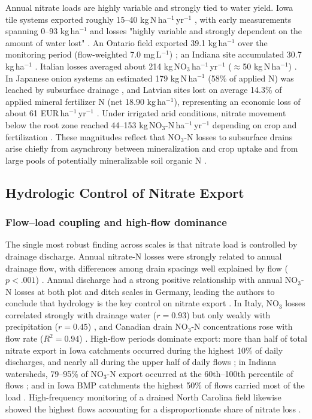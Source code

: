 \documentclass[11pt]{article}
\begin{document}
Annual nitrate loads are highly variable and strongly tied to water yield. Iowa tile systems exported roughly 15--40 kg\,N\,ha$^{-1}$\,yr$^{-1}$ \parencite{Kelley2017,Schilling2012b,Ikenberry2014}, with early measurements spanning 0--93 kg\,ha$^{-1}$ and losses "highly variable and strongly dependent on the amount of water lost" \parencite{BAKER1975}. An Ontario field exported 39.1 kg\,ha$^{-1}$ over the monitoring period (flow-weighted 7.0 mg\,L$^{-1}$) \parencite{Smith2011}; an Indiana site accumulated 30.7 kg\,ha$^{-1}$ \parencite{Williams2022}. Italian losses averaged about 214 kg\,NO$_3$\,ha$^{-1}$\,yr$^{-1}$ ($\approx$50 kg\,N\,ha$^{-1}$) \parencite{ROSSI1991}. In Japanese onion systems an estimated 179 kg\,N\,ha$^{-1}$ (58\% of applied N) was leached by subsurface drainage \parencite{Hayashi1999}, and Latvian sites lost on average 14.3\% of applied mineral fertilizer N (net 18.90 kg\,ha$^{-1}$), representing an economic loss of about 61 EUR\,ha$^{-1}$\,yr$^{-1}$ \parencite{Siksnane2017}. Under irrigated arid conditions, nitrate movement below the root zone reached 44--153 kg\,NO$_3$-N\,ha$^{-1}$\,yr$^{-1}$ depending on crop and fertilization \parencite{ROBBINS1980}. These magnitudes reflect that NO$_3$-N losses to subsurface drains arise chiefly from asynchrony between mineralization and crop uptake and from large pools of potentially mineralizable soil organic N \parencite{Cambardella1999}.

\subsection{Hydrologic Control of Nitrate Export}

\subsubsection{Flow--load coupling and high-flow dominance}

The single most robust finding across scales is that nitrate load is controlled by drainage discharge. Annual nitrate-N losses were strongly related to annual drainage flow, with differences among drain spacings well explained by flow ($p<.001$) \parencite{Kladivko2021}. Annual discharge had a strong positive relationship with annual NO$_3$-N losses at both plot and ditch scales in Germany, leading the authors to conclude that hydrology is the key control on nitrate export \parencite{Bauwe2020}. In Italy, NO$_3$ losses correlated strongly with drainage water ($r=0.93$) but only weakly with precipitation ($r=0.45$) \parencite{ROSSI1991}, and Canadian drain NO$_3$-N concentrations rose with flow rate ($R^2=0.94$) \parencite{Smith2011}. High-flow periods dominate export: more than half of total nitrate export in Iowa catchments occurred during the highest 10\% of daily discharges, and nearly all during the upper half of daily flows \parencite{Ikenberry2014}; in Indiana watersheds, 79--95\% of NO$_3$-N export occurred at the 60th--100th percentile of flows \parencite{Speir2021}; and in Iowa BMP catchments the highest 50\% of flows carried most of the load \parencite{Law2022}. High-frequency monitoring of a drained North Carolina field likewise showed the highest flows accounting for a disproportionate share of nitrate loss \parencite{Liu2020}.
\end{document}
